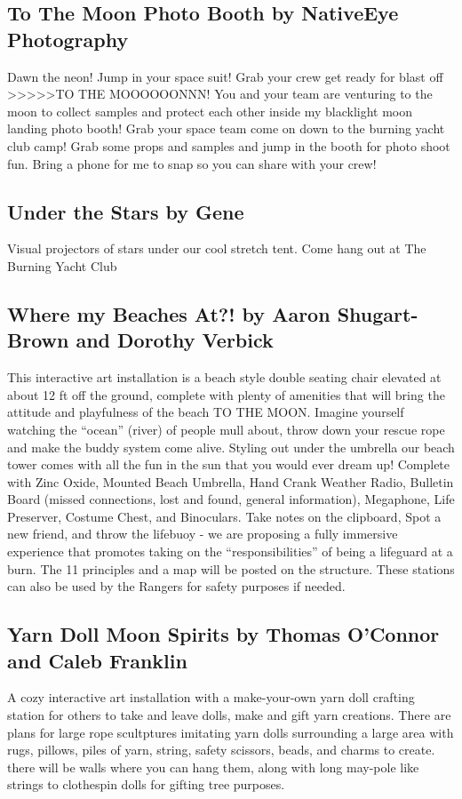 \begin{multicols}{2}
\subsection*{To The Moon Photo Booth by NativeEye Photography                 }
Dawn the neon! Jump in your space suit!
Grab your crew get ready for blast off >>>>>TO THE MOOOOOONNN!
You and your team are venturing to the moon to collect samples and protect each other inside my blacklight moon landing photo booth!
Grab your space team come on down to the burning yacht club camp! Grab some props and samples and jump in the booth for photo shoot fun. Bring a phone for me to snap so you can share with your crew!


\subsection*{Under the Stars by Gene                         }
Visual projectors of stars under our cool stretch tent. Come hang out at The Burning Yacht Club


\subsection*{Where my Beaches At?! by Aaron Shugart-Brown and Dorothy Verbick}
This interactive art installation is a beach style double seating chair elevated at about 12 ft off the ground, complete with plenty of amenities that will bring the attitude and playfulness of the beach TO THE MOON. Imagine yourself watching the “ocean” (river) of people mull about, throw down your rescue rope and make the buddy system come alive. Styling out under the umbrella our beach tower comes with all the fun in the sun that you would ever dream up! Complete with Zinc Oxide, Mounted Beach Umbrella, Hand Crank Weather Radio, Bulletin Board (missed connections, lost and found, general information), Megaphone, Life Preserver, Costume Chest, and Binoculars. Take notes on the clipboard, Spot a new friend, and throw the lifebuoy - we are proposing a fully immersive experience that promotes taking on the “responsibilities” of being a lifeguard at a burn. The 11 principles and a map will be posted on the structure. These stations can also be used by the Rangers for safety purposes if needed.                        


\subsection*{Yarn Doll Moon Spirits by Thomas O’Connor and Caleb Franklin                }
A cozy interactive art installation with a make-your-own yarn doll crafting station for others to take and leave dolls, make and gift yarn creations. There are plans for large rope scultptures imitating yarn dolls surrounding a large area with rugs, pillows, piles of yarn, string, safety scissors, beads, and charms to create. there will be walls where you can hang them, along with long may-pole like strings to clothespin dolls for gifting tree purposes.


\end{multicols}

